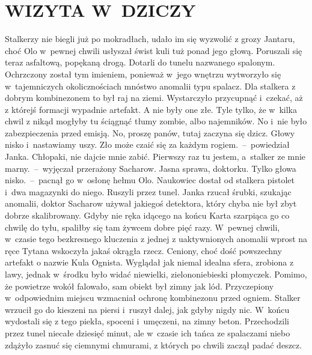 \documentclass[../MAIN.tex]{subfiles}
\begin{document}
\section*{WIZYTA W~DZICZY}
\mm Stalkerzy nie biegli już po mokradłach, udało im się wyzwolić z grozy Jantaru, choć Olo w~pewnej chwili usłyszał świst kuli tuż ponad jego głową. Poruszali się teraz asfaltową, popękaną drogą. Dotarli do tunelu nazwanego spalonym. Ochrzczony został tym imieniem, ponieważ w~jego wnętrzu wytworzyło się w~tajemniczych okolicznościach mnóstwo anomalii typu spalacz. Dla stalkera z dobrym kombinezonem to był raj na ziemi. Wystarczyło przycupnąć i~czekać, aż z którejś formacji wypadnie artefakt. A nie były one złe. Tyle tylko, że w~kilka chwil z nikąd mogłyby tu ściągnąć tłumy zombie, albo najemników. No i~nie było zabezpieczenia przed emisją.
\sx No, proszę panów, tutaj zaczyna się dzicz. Głowy nisko i~nastawiamy uszy. Zło może czaić się za każdym rogiem.~--~powiedział Janka.
\xx Chłopaki, nie dajcie mnie zabić. Pierwszy raz tu jestem, a~stalker ze mnie marny.~--~wyjęczał przerażony Sacharow.
\xx Jasna sprawa, doktorku. Tylko głowa nisko.~--~pacnął go w~osłonę hełmu Olo.
\qd \mm
Naukowiec dostał od stalkera pistolet i~dwa magazynki do niego. Ruszyli przez tunel. Janka rzucał śrubki, szukając anomalii, doktor Sacharow używał jakiegoś detektora, który chyba nie był zbyt dobrze skalibrowany. Gdyby nie ręka idącego na końcu Karta szarpiąca go co chwilę do tyłu, spaliłby się tam żywcem dobre pięć razy. W~pewnej chwili, w~czasie tego bezkresnego kluczenia z jednej z uaktywnionych anomalii wprost na ręce Tytana wskoczyła jakaś okrągła rzecz. Ceniony, choć dość powszechny artefakt o nazwie Kula Ognista. Wyglądał jak niemal idealna sfera, zrobiona z lawy, jednak w~środku było widać niewielki, zielononiebieski płomyczek. Pomimo, że powietrze wokół falowało, sam obiekt był zimny jak lód. Przyczepiony w~odpowiednim miejscu wzmacniał ochronę kombinezonu przed ogniem. Stalker wrzucił go do kieszeni na piersi i~ruszył dalej, jak gdyby nigdy nic. W~końcu wydostali się z tego piekła, spoceni i~umęczeni, na zimny beton. Przechodzili przez tunel niecałe dziesięć minut, ale w~czasie ich tańca ze
spalaczami niebo zdążyło zasnuć się ciemnymi chmurami, z których po chwili zaczął padać deszcz.
\end{document}
